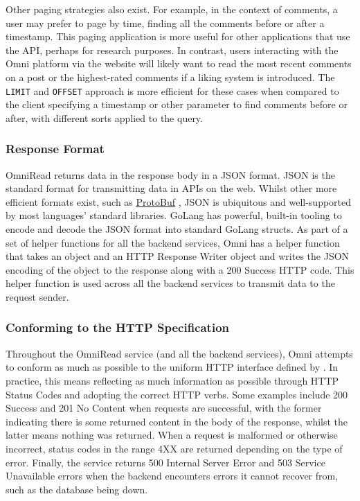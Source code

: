 

Other paging strategies also exist. For example, in the context of comments, a user may prefer to page by time, finding all the comments before or after a timestamp.
This paging application is more useful for other applications that use the API, perhaps for research purposes.
In contrast, users interacting with the Omni platform via the website will likely want to read the most recent comments on a post or the highest-rated comments if a liking system is introduced.
The \verb|LIMIT| and \verb|OFFSET| approach is more efficient for these cases when compared to the client specifying a timestamp or other parameter to find comments before or after, with different sorts applied to the query. 

\subsubsection{Response Format}
OmniRead returns data in the response body in a JSON format. JSON is the standard format for transmitting data in APIs on the web.
Whilst other more efficient formats exist, such as \underline{\href{https://protobuf.dev}{ProtoBuf}} \nocite{protobuf}, JSON is ubiquitous and well-supported by most languages' standard libraries.
GoLang has powerful, built-in tooling to encode and decode the JSON format into standard GoLang structs.
As part of a set of helper functions for all the backend services, Omni has a helper function that takes an object and an HTTP Response Writer object and writes the JSON encoding of the object to the response along with a 200 Success HTTP code.
This helper function is used across all the backend services to transmit data to the request sender. 
\newpage



\subsubsection{Conforming to the HTTP Specification}
Throughout the OmniRead service (and all the backend services), Omni attempts to conform as much as possible to the uniform HTTP interface defined by \citeauthor{fielding1999rfc2616}.
In practice, this means reflecting as much information as possible through HTTP Status Codes and adopting the correct HTTP verbs.
Some examples include 200 Success and 201 No Content when requests are successful, with the former indicating there is some returned content in the body of the response, whilst the latter means nothing was returned.
When a request is malformed or otherwise incorrect, status codes in the range 4XX are returned depending on the type of error.
Finally, the service returns 500 Internal Server Error and 503 Service Unavailable errors when the backend encounters errors it cannot recover from, such as the database being down. 

